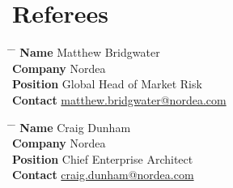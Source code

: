 \documentclass[10pt]{article} %
\begin{document}

        \section{Referees}

        \parbox{0.5\textwidth}{ %
            \begin{tabbing}
                \hspace{2.75cm} \= \hspace{4cm} \= \kill %
                {\bf Name} \> Matthew Bridgwater \\ %
                {\bf Company} \> Nordea \\ %
                {\bf Position} \> Global Head of Market Risk \\ %
                {\bf Contact} \> \href{mailto:matthew.bridgwater@nordea.com}{matthew.bridgwater@nordea.com} %
            \end{tabbing}}
            \hfill %
            \parbox{0.5\textwidth}{ %
                \begin{tabbing}
                    \hspace{2.75cm} \= \hspace{4cm} \= \kill %
                    {\bf Name} \> Craig Dunham\\ %
                    {\bf Company} \> Nordea \\ %
                    {\bf Position} \> Chief Enterprise Architect \\ %
                    {\bf Contact} \> \href{mailto:craig.dunham@nordea.com}{craig.dunham@nordea.com} %
                \end{tabbing}}


    
\end{document}
